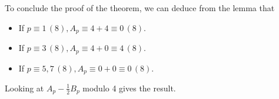 \documentclass[11pt,a4paper]{amsart}
\theoremstyle{plain}
\theoremstyle{definition}
\theoremstyle{remark}
\numberwithin{equation}{section}
\newcommand{\1}{{\mathds 1}}
\begin{document}
To conclude the proof of the theorem, we can deduce from the lemma that
\begin{itemize}
  \item If $p \equiv 1 \, (8), A_p \equiv 4+4 \equiv 0 \, (8)$.
  \item If $p \equiv 3 \, (8), A_p \equiv 4 + 0 \equiv 4 \, (8)$.
  \item If $p \equiv 5, 7 \, (8), A_p \equiv 0 + 0 \equiv 0 \, (8)$.
\end{itemize} 
Looking at $A_p - \frac{1}{2} B_p$ modulo 4 gives the result.

\end{document}
